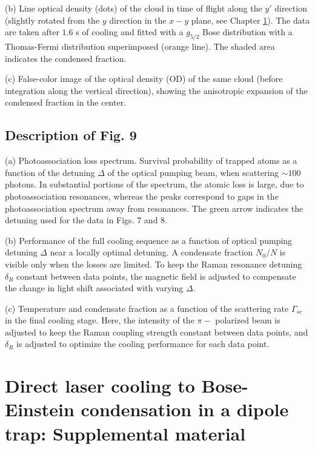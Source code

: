 \documentclass{article}
\begin{document}
(b) Line optical density (dots) of the cloud in time of flight along the $y'$ direction (slightly rotated from the $y$ direction in the $x-y$ plane, see Chapter \ref{sec: supple}). The data are taken after $1.6$ s of cooling and fitted with a $g_{5/2}$ Bose distribution with a Thomas-Fermi distribution superimposed (orange line). The shaded area indicates the condensed fraction. 

(c) False-color image of the optical density (OD) of the same cloud (before integration along the vertical direction), showing the anisotropic expansion of the condensed fraction in the center.

\subsection{Description of Fig. 9}
(a) Photoassociation loss spectrum. Survival probability of trapped atoms as a function of the detuning $\Delta$ of the optical pumping beam, when scattering $\sim 100$ photons. In substantial portions of the spectrum, the atomic loss is large, due to photoassociation resonances, whereas the peaks correspond to gaps in the photoassociation spectrum away from resonances. The green arrow indicates the detuning used for the data in Figs. 7 and 8. 

(b) Performance of the full cooling sequence as a function of optical pumping detuning $\Delta$ near a locally optimal detuning. A condensate fraction $N_0/N$ is visible only when the losses are limited. To keep the Raman resonance detuning $\delta_R$ constant between data points, the magnetic field is adjusted to compensate the change in light shift associated with varying $\Delta$. 

(c) Temperature and condensate fraction as a function of the scattering rate $\Gamma_{sc}$ in the final cooling stage. Here, the intensity of the $\pi -$ polarized beam is adjusted to keep the Raman coupling strength constant between data points, and $\delta_R$ is adjusted to optimize the cooling performance for each data point.

\section{Direct laser cooling to Bose-Einstein condensation in a dipole trap: Supplemental material}
\label{sec: supple}
\end{document}
